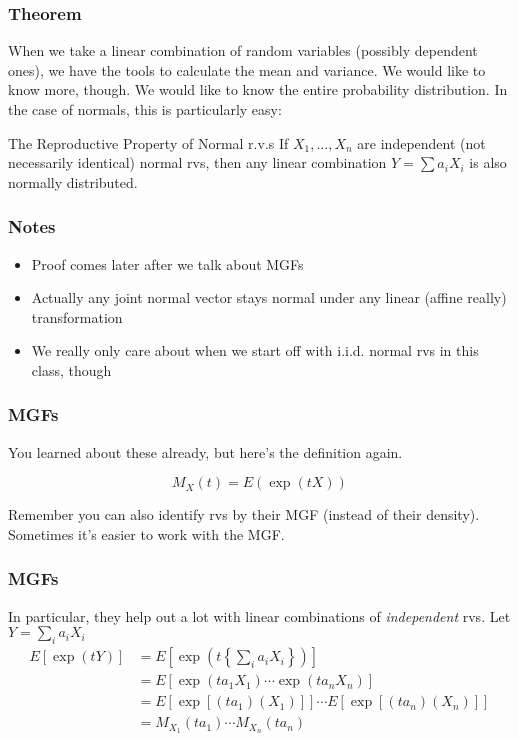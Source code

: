 \documentclass{beamer}
\begin{document}
\begin{frame}
\frametitle{Theorem}

When we take a linear combination of random variables (possibly dependent ones), we have the tools to calculate the mean and variance. We would like to know more, though. We would like to know the entire probability distribution. In the case of normals, this is particularly easy:

\begin{block}{The Reproductive Property of Normal r.v.s}
If $X_1, \ldots, X_n$ are independent (not necessarily identical) normal rvs, then any linear combination  $Y = \sum a_i X_i$ is also normally distributed.
\end{block}


\end{frame}



\begin{frame}
\frametitle{Notes}

\begin{itemize}
\item Proof comes later after we talk about MGFs
\item Actually any joint normal vector stays normal under any linear (affine really) transformation
\item We really only care about when we start off with i.i.d. normal rvs in this class, though
\end{itemize}

\end{frame}



\begin{frame}
\frametitle{MGFs}

You learned about these already, but here's the definition again.

\[
M_X(t) = E(\exp (tX) )
\]

Remember you can also identify rvs by their MGF (instead of their density). Sometimes it's easier to work with the MGF.
\end{frame}

\begin{frame}
\frametitle{MGFs}

In particular, they help out a lot with linear combinations of \emph{independent} rvs. Let $Y = \sum_i a_i X_i$
\begin{align*}
E[\exp(tY) ]  &= E[\exp(t \left\{ \sum_i a_i X_i  \right\}) ] \\
&= E[\exp(t a_1 X_1) \cdots \exp(t a_n X_n) ] \\
&= E[\exp[(t a_1)( X_1)]] \cdots E[\exp[(t a_n) (X_n)] ] \\
&= M_{X_1}(t a_1) \cdots M_{X_n}(t a_n)
\end{align*}


\end{frame}
\end{document}
